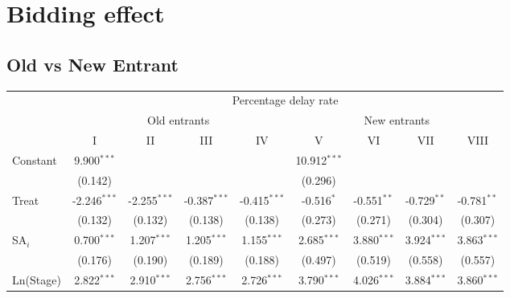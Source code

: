 \documentclass[
]{article}
\begin{document}
\hypertarget{bidding-effect}{%
\section{Bidding effect}\label{bidding-effect}}

\hypertarget{old-vs-new-entrant}{%
\subsection{Old vs New Entrant}\label{old-vs-new-entrant}}

\begingroup
\centering
\small
\begin{tabular}{lcccccccc}
   \toprule
    & \multicolumn{8}{c}{Percentage delay rate}\\
    & \multicolumn{4}{c}{Old entrants} & \multicolumn{4}{c}{New entrants} \\ \cmidrule(lr){2-5} \cmidrule(lr){6-9}
                                         & I              & II             & III            & IV             & V              & VI            & VII           & VIII\\  
   Constant                              & 9.900$^{***}$  &                &                &                & 10.912$^{***}$ &               &               &   \\   
                                         & (0.142)        &                &                &                & (0.296)        &               &               &   \\   
   Treat                                 & -2.246$^{***}$ & -2.255$^{***}$ & -0.387$^{***}$ & -0.415$^{***}$ & -0.516$^{*}$   & -0.551$^{**}$ & -0.729$^{**}$ & -0.781$^{**}$\\   
                                         & (0.132)        & (0.132)        & (0.138)        & (0.138)        & (0.273)        & (0.271)       & (0.304)       & (0.307)\\   
   SA$_i$                                & 0.700$^{***}$  & 1.207$^{***}$  & 1.205$^{***}$  & 1.155$^{***}$  & 2.685$^{***}$  & 3.880$^{***}$ & 3.924$^{***}$ & 3.863$^{***}$\\   
                                         & (0.176)        & (0.190)        & (0.189)        & (0.188)        & (0.497)        & (0.519)       & (0.558)       & (0.557)\\   
   Ln(Stage)                             & 2.822$^{***}$  & 2.910$^{***}$  & 2.756$^{***}$  & 2.726$^{***}$  & 3.790$^{***}$  & 4.026$^{***}$ & 3.884$^{***}$ & 3.860$^{***}$\\   

\end{tabular}
\end{document}
